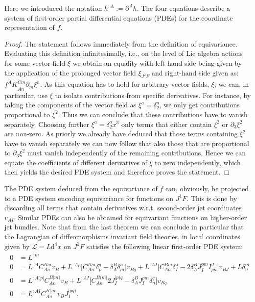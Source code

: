 Here we introduced the notation $h^{:A} := \partial^A h$. The four equations describe a system of first-order partial differential equations (PDEs) for the coordinate representation of $f$. 
\begin{proof}
The statement follows immediately from the definition of equivariance. Evaluating this definition infinitesimally, i.e., on the level of Lie algebra actions for some vector field $\xi$ we obtain an equality with left-hand side being given by the application of the prolonged vector field $\xi_{J^2F}$ and right-hand side given as: $f^{\tilde{A}}K_{\tilde{A}n}^{\tilde{C}m} \partial_m \xi^n$. As this equation has to hold for arbitrary vector fields, $\xi$, we can, in particular, use $\xi$ to isolate contributions from specific derivatives. 
For instance, by taking the components of the vector field as $\xi^a = \delta^a_2$, we only get contributions proportional to $\xi^2$. Thus we can conclude that these contributions have to vanish separately. Choosing further $\xi^a = \delta^a_2 x^3$ only terms that either contain $\xi^2$ or $\partial_3 \xi^2$ are non-zero. As priorly we already have deduced that those terms containing $\xi^2$ have to vanish separately we can now follow that also those that are proportional to $\partial_3 \xi ^2$ must vanish independently of the remaining contributions.
Hence we can equate the coefficients of different derivatives of $\xi$ to zero independently, which then yields the desired PDE system and therefore proves the statement.  
\end{proof}
The PDE system deduced from the equivariance of $f$ can, obviously, be projected to a PDE system encoding equivariance for functions on $J^1F$. This is done by discarding all terms that contain derivatives w.r.t. second-order jet coordinates $v_{AI}$. 
Similar PDEs can also be obtained for equivariant functions on higher-order jet bundles.
Note that from the last theorem we can conclude in particular that the Lagrangian of diffeomorphisms invariant field theories, in local coordinates given by $\mathcal{L} = L \mathrm{d}^4x$ on $J^2F$ satisfies the following linear first-order PDE system:  
\begin{align}\label{DiffeoEqn}
\begin{aligned}
    0 &= L^{:m} \\
    0 &= L^{:A} C_{An}^{Bm} v_B + L^{:Ap} \bigl[ C_{An}^{Bm} \delta_p^q - \delta_A^B \delta_m^n \bigr] v_{Bq} + L^{:AI} \bigl[ C_{An}^{Bm} \delta_I^J - 2 \delta_A^B J_I^{pm} I^J_{pn}  \bigr] v_{BJ} + L \delta^m_n \\
    0 &= L^{:A(p\vert}C_{An}^{B \vert m)} v_B + L^{: AI} \bigl[ C_{An}^{B(m\vert} 2 J_I^{\vert p) q} - \delta^B_A J_I ^{pm} \delta_n^q \bigr] v_{Bq} \\
    0 &= L^{:AI} C_{An}^{B(m\vert} v_B J_I^{\vert p q )}.
    \end{aligned}
\end{align}
